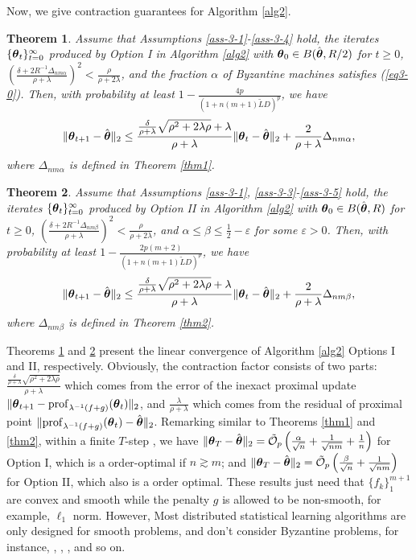 \documentclass[12pt,a4paper]{article}%
\newtheorem{thm}{Theorem}[section]
\newcommand{\be}{\begin{equation}}
\newcommand{\ee}{\end{equation}}
\newcommand \vc[1]{{\mbox{\boldmath${#1}$}}}
\newcommand \vtheta{\vc \theta}
\numberwithin{equation}{section}
\newcommand{\sbr}[1]{\left(#1\right)}        %
\begin{document}
Now, we give contraction guarantees for Algorithm \ref{alg2}.

\begin{thm}\label{thm5}
Assume that Assumptions \ref{ass-3-1}-\ref{ass-3-4} hold, the iterates $\{\vtheta_t\}_{t=0}^\infty$ produced by Option I in Algorithm \ref{alg2} with $\vtheta_0\in B(\hat{\vtheta}, R/2)$ for $t\geq0$, $\sbr{\frac{\delta+2R^{-1}\Delta_{nm\alpha}}{\rho+\lambda}}^2<\frac{\rho}{\rho+2\lambda}$, and the fraction $\alpha$ of Byzantine machines satisfies (\ref{eq3-0}).
Then, with probability at least $1-\frac{4p}{(1+n(m+1)\tilde{L}D)^p}$, we have
\be\label{eq4-2}
\|\vtheta_{t+1}-\hat{\vtheta}\|_2\leq \frac{\frac{\delta}{\rho+\lambda}\sqrt{\rho^2+2\lambda\rho}+\lambda}{\rho+\lambda}\|\vtheta_{t}-\hat{\vtheta}\|_2+\frac{2}{\rho+\lambda}\Delta_{nm\alpha},
\ee
where $\Delta_{nm\alpha}$ is defined in Theorem \ref{thm1}.
\end{thm}


\begin{thm}\label{thm6}
Assume that Assumptions \ref{ass-3-1}, \ref{ass-3-3}-\ref{ass-3-5} hold, the iterates $\{\vtheta_t\}_{t=0}^\infty$ produced by Option II in Algorithm \ref{alg2} with $\vtheta_0\in B(\hat{\vtheta}, R)$ for $t\geq0$,
$\sbr{\frac{\delta+2R^{-1}\Delta_{nm\beta}}{\rho+\lambda}}^2<\frac{\rho}{\rho+2\lambda}$, and $\alpha\leq \beta\leq \frac{1}{2}-\varepsilon$ for some $\varepsilon>0$. Then, with probability at least $1-\frac{2p(m+2)}{(1+n(m+1)\tilde{L}D)^p}$, we have
$$
\|\vtheta_{t+1}-\hat{\vtheta}\|_2
\leq \frac{\frac{\delta}{\rho+\lambda}\sqrt{\rho^2+2\lambda\rho}+\lambda}{\rho+\lambda}\|\vtheta_{t}-\hat{\vtheta}\|_2+\frac{2}{\rho+\lambda}\Delta_{nm\beta},
$$
where $\Delta_{nm\beta}$ is defined in Theorem \ref{thm2}.
\end{thm}

Theorems \ref{thm5} and \ref{thm6} present the linear convergence of Algorithm \ref{alg2} Options I and II, respectively. Obviously, the contraction factor consists of two parts: $\frac{\frac{\delta}{\rho+\lambda}\sqrt{\rho^2+2\lambda\rho}}{\rho+\lambda}$ which comes from the error of the inexact proximal update $\|\vtheta_{t+1}-\mathrm{prof}_{\lambda^{-1}(f+g)}(\vtheta_t)\|_2$, and $\frac{\lambda}{\rho+\lambda}$ which comes from the residual of proximal point $\|\mathrm{prof}_{\lambda^{-1}(f+g)}(\vtheta_t)-\hat{\vtheta}\|_2$.
Remarking similar to Theorems \ref{thm1} and \ref{thm2}, within a finite $T$-step , we have
$\|\vtheta_{T}-\hat{\vtheta}\|_2=\tilde{\mathcal{O}}_p\sbr{\frac{\alpha}{\sqrt{n}}+\frac{1}{\sqrt{nm}}+\frac{1}{n}}$ for Option I, which is a order-optimal if $n\gtrsim m$; and $\|\vtheta_{T}-\hat{\vtheta}\|_2=\mathcal{\tilde{O}}_p\sbr{\frac{\beta}{\sqrt{n}}+\frac{1}{\sqrt{nm}}}$ for Option II, which also is a order optimal. These results just need that $\{f_k\}_1^{m+1}$ are convex and smooth while the penalty $g$ is allowed to be non-smooth, for example, $\ell_1$ norm. However, Most distributed statistical learning algorithms are only designed for smooth problems, and don't consider Byzantine problems, for instance, \cite{Shamiretal2014}, \cite{WangKolarSZ2017}, \cite{JordanLeeYang2019}, and so on.
\end{document}
